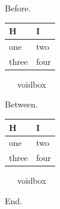 \documentclass{article}
\begin{document}
\newcommand\rows[1]{\count255=0 \loop a & b \\ \advance\count255 by 1 \ifnum\count255<#1 \repeat}
Before.
\begin{longtable}{ll}
\toprule
H & I \\
\midrule
\endhead
\bottomrule
\endfoot
one & two \\
three & four \\
\end{longtable}
\makeatletter\par \the\vsize\ \the\pagegoal\ \the\@colroom\ \ifvoid\LT@foot void\else box\fi\par\makeatother
Between.
\begin{longtable}{ll}
\toprule
H & I \\
\midrule
\endhead
\bottomrule
\endfoot
one & two \\
three & four \\
\end{longtable}
\makeatletter\par \the\vsize\ \the\pagegoal\ \the\@colroom\ \ifvoid\LT@foot void\else box\fi\par\makeatother
End.
\end{document}
